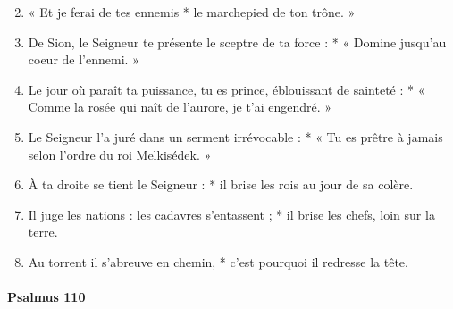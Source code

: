 \documentclass[twoside]{article}
\begin{document}
\begin{paracol}[1]{2}
\begin{enumerate}[wide, itemsep=0mm, labelwidth=!, labelindent=0pt, label=\color{gregoriocolor}\theenumi]
\setcounter{enumi}{1}
\item « Et je ferai de tes ennemis * le marchepied de ton trône. »
\item De Sion, le Seigneur te présente le sceptre de ta force : * « Domine jusqu'au coeur de l'ennemi. »
\item Le jour où paraît ta puissance, tu es prince, éblouissant de sainteté : * « Comme la rosée qui naît de l'aurore, je t'ai engendré. »
\item Le Seigneur l'a juré dans un serment irrévocable : * « Tu es prêtre à jamais selon l'ordre du roi Melkisédek. »
\item À ta droite se tient le Seigneur : * il brise les rois au jour de sa colère.
\item Il juge les nations : les cadavres s'entassent ; * il brise les chefs, loin sur la terre.
\item Au torrent il s'abreuve en chemin, * c'est pourquoi il redresse la tête.
\end{enumerate}

\switchcolumn*
\paragraph{Psalmus 110}




\end{paracol}
\end{document}
